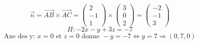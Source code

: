 \documentclass{article}
\begin{document}
\[ \vec{n} = \vec{AB} \times \vec{AC} = \begin{pmatrix} 2 \\ -1 \\ 1 \end{pmatrix} \times \begin{pmatrix} 3 \\ 0 \\ 2 \end{pmatrix} = \begin{pmatrix} -2 \\ -1 \\ 3 \end{pmatrix} \]
\[ \Pi: -2x - y + 3z = -7 \]
\[ \text{Axe des y: } x = 0 \text{ et } z = 0 \text{ donne } -y = -7 \Leftrightarrow y = 7 \Rightarrow (0, 7, 0) \]
\end{document}
